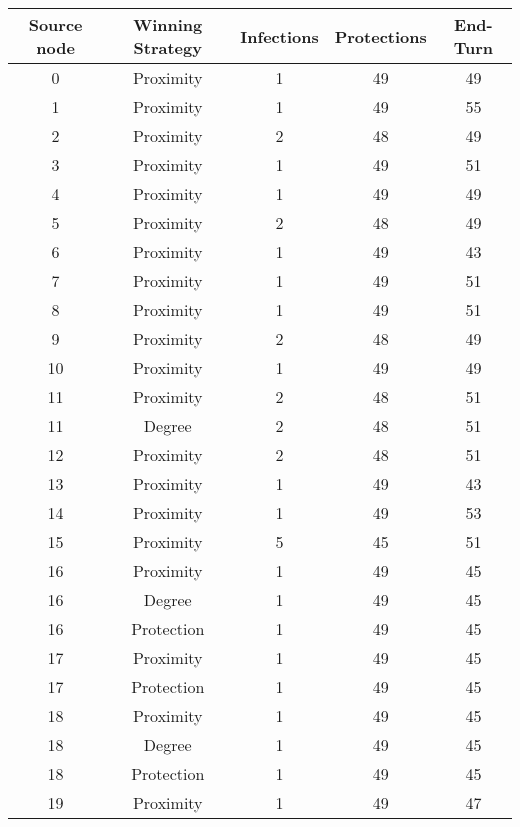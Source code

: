 \documentclass[results.tex]{subfiles}
\begin{document}
\begin{center}
  \begin{tabular}{| c || c | c | c | c |}
    \hline
    {\bfseries Source node} & {\bfseries Winning Strategy} & {\bfseries Infections} & {\bfseries Protections} & {\bfseries End-Turn} \\  %
    \hline\hline
    0 & Proximity & 1 & 49 & 49 \\ 
    \hline
    1 & Proximity & 1 & 49 & 55 \\ 
    \hline
    2 & Proximity & 2 & 48 & 49 \\ 
    \hline
    3 & Proximity & 1 & 49 & 51 \\ 
    \hline
    4 & Proximity & 1 & 49 & 49 \\ 
    \hline
    5 & Proximity & 2 & 48 & 49 \\ 
    \hline
    6 & Proximity & 1 & 49 & 43 \\ 
    \hline
    7 & Proximity & 1 & 49 & 51 \\ 
    \hline
    8 & Proximity & 1 & 49 & 51 \\ 
    \hline
    9 & Proximity & 2 & 48 & 49 \\ 
    \hline
    10 & Proximity & 1 & 49 & 49 \\ 
    \hline
    11 & Proximity & 2 & 48 & 51 \\ 
    \hline
    11 & Degree & 2 & 48 & 51 \\ 
    \hline
    12 & Proximity & 2 & 48 & 51 \\ 
    \hline
    13 & Proximity & 1 & 49 & 43 \\ 
    \hline
    14 & Proximity & 1 & 49 & 53 \\ 
    \hline
    15 & Proximity & 5 & 45 & 51 \\ 
    \hline
    16 & Proximity & 1 & 49 & 45 \\ 
    \hline
    16 & Degree & 1 & 49 & 45 \\ 
    \hline
    16 & Protection & 1 & 49 & 45 \\ 
    \hline
    17 & Proximity & 1 & 49 & 45 \\ 
    \hline
    17 & Protection & 1 & 49 & 45 \\ 
    \hline
    18 & Proximity & 1 & 49 & 45 \\ 
    \hline
    18 & Degree & 1 & 49 & 45 \\ 
    \hline
    18 & Protection & 1 & 49 & 45 \\ 
    \hline
    19 & Proximity & 1 & 49 & 47 \\ 

\end{tabular}
\end{center}
\end{document}
